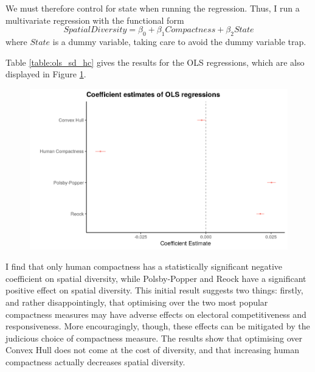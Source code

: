 \documentclass[]{article}
\begin{document}
We must therefore control for state when running the regression. Thus, I
run a multivariate regression with the functional form
\[SpatialDiversity = \beta_0 +
\beta_1 Compactness + \beta_2 State\] where \(State\) is a dummy
variable, taking care to avoid the dummy variable trap.

Table \ref{table:ols_sd_hc} gives the results for the OLS regressions,
which are also displayed in Figure \ref{regression_coefficients}.

\begin{figure}
\centering
\includegraphics{../30_results/regression_coefficients.png}
\caption{\label{regression_coefficients}}
\end{figure}

I find that only human compactness has a statistically significant
negative coefficient on spatial diversity, while Polsby-Popper and Reock
have a significant positive effect on spatial diversity. This initial
result suggests two things: firstly, and rather disappointingly, that
optimising over the two most popular compactness measures may have
adverse effects on electoral competitiveness and responsiveness. More
encouragingly, though, these effects can be mitigated by the judicious
choice of compactness measure. The results show that optimising over
Convex Hull does not come at the cost of diversity, and that increasing
human compactness actually decreases spatial diversity.
\end{document}
